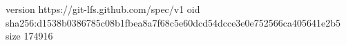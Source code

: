 version https://git-lfs.github.com/spec/v1
oid sha256:d1538b0386785c08b1fbea8a7f68c5e60dcd54dcce3e0e752566ca405641e2b5
size 174916
